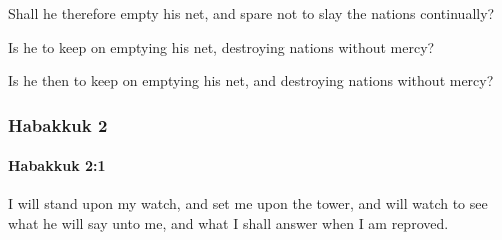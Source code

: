 			\begin{versebox}
					\item[BHS] 
					\item[LXX] 
					\item[ASV] Shall he therefore empty his net, and spare not to slay the nations continually?
					\item[NIV] Is he to keep on emptying his net, destroying nations without mercy?
					\item[NRSV] Is he then to keep on emptying his net, and destroying nations without mercy?
			\end{versebox}
	\subsubsection{Habakkuk 2} %
		\label{HABAKKUK-2}

		\paragraph{Habakkuk 2:1} %
			\label{HABAKKUK-2-1}

			I will stand upon my watch, and set me upon the tower, and will watch to see what he will say unto me, and what I shall answer when I am reproved.

